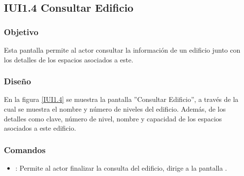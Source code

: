 \subsection{IUI1.4 Consultar Edificio}

\subsubsection{Objetivo}
	Esta pantalla permite al actor consultar la información de un edificio junto con los detalles de los espacios asociados a este.

\subsubsection{Diseño}
	En la figura \ref{IUI1.4} se muestra la pantalla ''Consultar Edificio'', a través de la cual se muestra el nombre y número de niveles del edificio. Además, de los detalles como clave, número de nivel, nombre y capacidad de los espacios asociados a este edificio.


\subsubsection{Comandos}
\begin{itemize}
	\item {}: Permite al actor finalizar la consulta del edificio, dirige a la pantalla .

\end{itemize}

